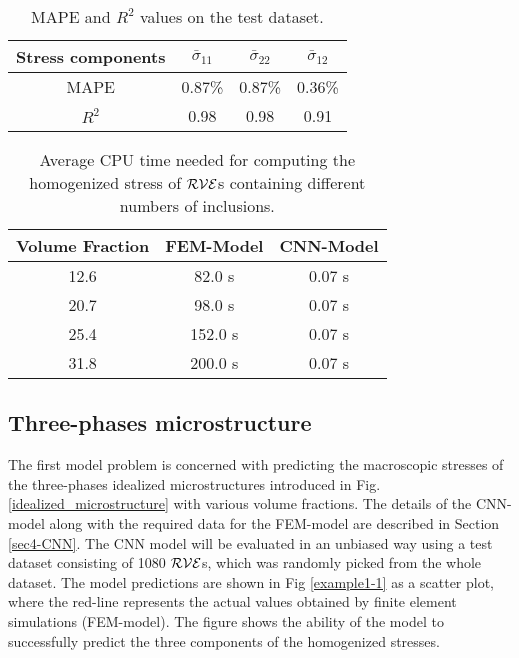 \documentclass[final,3p,times]{elsarticle}
\begin{document}
\begin{table}[t]
\centering
	\begin{tabular}{||c c c c ||} 
		\hline
		Stress components & $\bar{\sigma}_{11}$ & $\bar{\sigma}_{22}$& $\bar{\sigma}_{12}$  \\ [0.5ex] 
		\hline\hline
		MAPE & 0.87\% & 0.87\% &0.36\%  \\ 
		\hline
		$R^2$& 0.98 &0.98  &0.91 \\
		\hline
	\end{tabular}
	\caption{MAPE and $R^2$ values on the test dataset.}
	\label{table:Mape and r2}
\end{table}
%
\begin{table}[t]
	
	\centering
	\begin{tabular}{||c c c  ||} 
		\hline
		Volume Fraction & FEM-Model & CNN-Model \\ [0.5ex] 
		\hline\hline
		12.6 & 82.0 s & 0.07 s \\ 
		\hline
		20.7 & 98.0 s & 0.07 s \\
		\hline
		25.4 & 152.0 s & 0.07 s \\
		\hline
		31.8 & 200.0 s & 0.07 s \\
		\hline
	\end{tabular}
	\caption{Average CPU time needed for computing the homogenized stress of $\cal{RVE}$s containing different numbers of inclusions.}
	\label{table:time comparison}
\end{table}

\subsection{Three-phases microstructure}
\label{sec5-1-CNN}


The first model problem is concerned with predicting the macroscopic stresses of the three-phases idealized microstructures introduced in Fig. \ref{idealized_microstructure} with various volume fractions. The details of the CNN-model along with the required data for the FEM-model are described in Section \ref{sec4-CNN}. The CNN model will be evaluated in an unbiased way using a test dataset consisting of 1080 $\cal{RVE}$s, which was randomly picked from the whole dataset. The model predictions are shown in Fig \ref{example1-1} as a scatter plot, where the red-line represents the actual values obtained by finite element simulations (FEM-model). The figure shows the ability of the model to successfully predict the three components of the homogenized stresses. 
\end{document}
